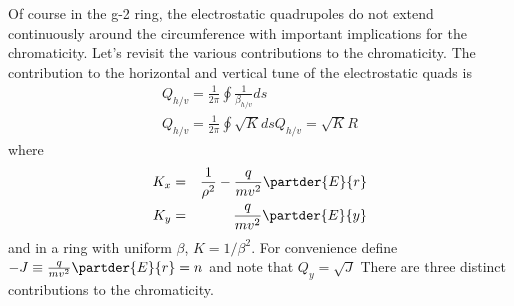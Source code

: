 \documentclass[10pt]{article}
\begin{document}
Of course in the g-2 ring, the electrostatic quadrupoles do not extend continuously around the circumference with important
implications for the chromaticity. Let's revisit the various contributions to the chromaticity.
The contribution to the horizontal and vertical tune of the electrostatic quads is
\begin{eqnarray}
Q_{h/v} = \frac{1}{2\pi}\oint \frac{1}{\beta_{h/v}} ds\nonumber\\
Q_{h/v} = \frac{1}{2\pi}\oint  \sqrt{K} ds \nonumber
Q_{h/v} =  \sqrt{K} R \label{eq:tunechrom}
\end{eqnarray}
where 
\begin{eqnarray*}
K_x &=& \frac{1}{\rho^2} - \frac{q}{mv^2}\partder{E}{r}\\
K_y &=& \frac{q}{mv^2}\partder{E}{y}\\
\end{eqnarray*}
and in a ring with uniform $\beta$, $K=1/\beta^2$.
For convenience define $-J \equiv \frac{q}{mv^2}\partder{E}{r}=n$ and note that $Q_y = \sqrt{J}$
There are three distinct contributions to the chromaticity.
\end{document}
